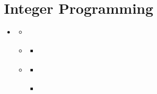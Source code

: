 \documentclass[letterpaper,10pt,english]{sphinxmanual}
\begin{document}
\chapter{Integer Programming}
\label{\detokenize{operationsResearch/IP:integer-programming}}\label{\detokenize{operationsResearch/IP::doc}}
\begin{sphinxShadowBox}
\begin{itemize}
\item {} 
\sphinxAtStartPar
{}\label{\detokenize{operationsResearch/IP:id4}}{\hyperref[\detokenize{operationsResearch/IP:integer-programming}]{}}
\begin{itemize}
\item {} 
\sphinxAtStartPar
{}\label{\detokenize{operationsResearch/IP:id5}}{\hyperref[\detokenize{operationsResearch/IP:ip-model}]{}}

\item {} 
\sphinxAtStartPar
{}\label{\detokenize{operationsResearch/IP:id6}}{\hyperref[\detokenize{operationsResearch/IP:solution-methods}]{}}
\begin{itemize}
\item {} 
\sphinxAtStartPar
{}\label{\detokenize{operationsResearch/IP:id7}}{\hyperref[\detokenize{operationsResearch/IP:the-branch-and-bound-algorithm}]{}}

\end{itemize}

\item {} 
\sphinxAtStartPar
{}\label{\detokenize{operationsResearch/IP:id8}}{\hyperref[\detokenize{operationsResearch/IP:applications}]{}}
\begin{itemize}
\item {} 
\sphinxAtStartPar
{}\label{\detokenize{operationsResearch/IP:id9}}{\hyperref[\detokenize{operationsResearch/IP:machine-scheduling-problem}]{}}

\item {} 
\sphinxAtStartPar
{}\label{\detokenize{operationsResearch/IP:id10}}{\hyperref[\detokenize{operationsResearch/IP:facility-location-problem}]{}}

\end{itemize}

\end{itemize}

\end{itemize}
\end{sphinxShadowBox}
\end{document}
